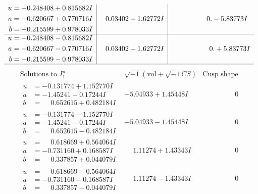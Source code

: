 \documentclass[1p]{elsarticle_modified}
\theoremstyle{definition}
\newcommand{\I}{\sqrt{-1}}
\begin{document}
$$\begin{array}{c|c|c}
\begin{aligned}
u &= -0.248408 + 0.815682 I \\
a &= -0.620667 + 0.770716 I \\
b &= -0.215599 + 0.978033 I\end{aligned}
 & \phantom{-}0.03402 + 1.62772 I & \phantom{-0.000000 } 0. - 5.83773 I \\ \hline\begin{aligned}
u &= -0.248408 - 0.815682 I \\
a &= -0.620667 - 0.770716 I \\
b &= -0.215599 - 0.978033 I\end{aligned}
 & \phantom{-}0.03402 - 1.62772 I & \phantom{-0.000000 -}0. + 5.83773 I\\
 \hline 
 \end{array}$$\newpage$$\begin{array}{c|c|c}  
\text{Solutions to }I^u_{1}& \I (\text{vol} + \sqrt{-1}CS) & \text{Cusp shape}\\
 \hline 
\begin{aligned}
u &= -0.131774 + 1.152770 I \\
a &= -1.45241 - 0.17244 I \\
b &= \phantom{-}0.652615 + 0.482184 I\end{aligned}
 & -5.04933 + 1.45448 I & \phantom{-0.000000 } 0 \\ \hline\begin{aligned}
u &= -0.131774 - 1.152770 I \\
a &= -1.45241 + 0.17244 I \\
b &= \phantom{-}0.652615 - 0.482184 I\end{aligned}
 & -5.04933 - 1.45448 I & \phantom{-0.000000 } 0 \\ \hline\begin{aligned}
u &= \phantom{-}0.618669 + 0.564064 I \\
a &= -0.731160 + 0.168587 I \\
b &= \phantom{-}0.337857 + 0.044079 I\end{aligned}
 & \phantom{-}1.11274 + 1.43343 I & \phantom{-0.000000 } 0 \\ \hline\begin{aligned}
u &= \phantom{-}0.618669 - 0.564064 I \\
a &= -0.731160 - 0.168587 I \\
b &= \phantom{-}0.337857 - 0.044079 I\end{aligned}
 & \phantom{-}1.11274 - 1.43343 I & \phantom{-0.000000 } 0 \\ \hline\begin{aligned}

\end{aligned}
\end{array}$$
\end{document}
